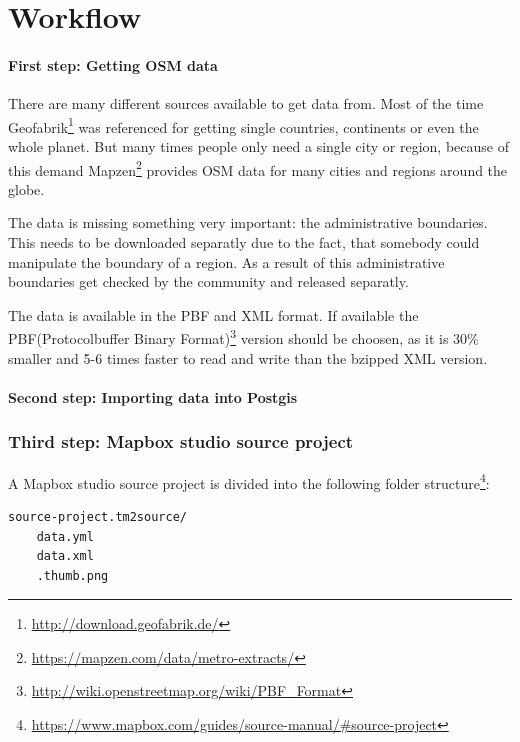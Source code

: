 \section{Workflow}\label{workflow}

\paragraph{First step: Getting OSM
data}\label{first-step-getting-osm-data}

There are many different sources available to get \osm{} data from. Most of
the time Geofabrik\footnote{\url{http://download.geofabrik.de/}} was
referenced for getting single countries, continents or even the whole
planet. But many times people only need a single city or region, because
of this demand
Mapzen\footnote{\url{https://mapzen.com/data/metro-extracts/}} provides
OSM data for many cities and regions around the globe.

The \osm{} data is missing something very important: the administrative
boundaries. This needs to be downloaded separatly due to the fact, that
somebody could manipulate the boundary of a region. As a result of this
administrative boundaries get checked by the \osm{} community and released
separatly.

The data is available in the PBF and \osm{} XML format. If available the
PBF(Protocolbuffer Binary
Format)\footnote{\url{http://wiki.openstreetmap.org/wiki/PBF_Format}}
version should be choosen, as it is 30\% smaller and 5-6 times faster to
read and write than the bzipped \osm{} XML version.

\paragraph{Second step: Importing \osm{} data into
Postgis}\label{second-step-importing-osm-data-into-postgis}


\subsubsection{Third step: Mapbox studio source
project}\label{third-step-mapbox-studio-source-project}

A Mapbox studio source project is divided into the following folder
structure\footnote{\url{https://www.mapbox.com/guides/source-manual/\#source-project}}:

\begin{verbatim}
source-project.tm2source/
    data.yml
    data.xml
    .thumb.png
\end{verbatim}

